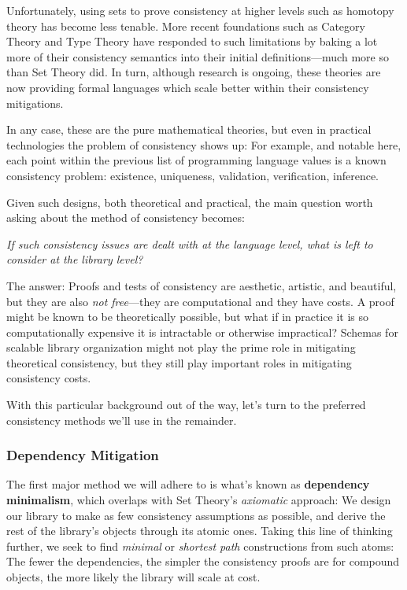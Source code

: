 \documentclass[twoside]{article}
\newcommand{\strong}[1]{{\bfseries #1}}
\begin{document}
Unfortunately, using sets to prove consistency at higher levels such as homotopy theory has become less tenable. More recent
foundations such as Category Theory and Type Theory have responded to such limitations by baking a lot more of their consistency
semantics into their initial definitions---much more so than Set Theory did. In turn, although research is ongoing, these theories
are now providing formal languages which scale better within their consistency mitigations.

In any case, these are the pure mathematical theories, but even in practical technologies the problem of consistency shows
up: For example, and notable here, each point within the previous list of programming language values is a known consistency
problem: existence, uniqueness, validation, verification, inference.

Given such designs, both theoretical and practical, the main question worth asking about the method of consistency becomes:

\begin{center}
\emph{If such consistency issues are dealt with at the language level, what is left to consider at the library level?}
\end{center}

The answer: Proofs and tests of consistency are aesthetic, artistic, and beautiful, but they are also \emph{not free}---they
are computational and they have costs. A proof might be known to be theoretically possible, but what if in practice it is so
computationally expensive it is intractable or otherwise impractical? Schemas for scalable library organization might not play
the prime role in mitigating theoretical consistency, but they still play important roles in mitigating consistency costs.

With this particular background out of the way, let's turn to the preferred consistency methods we'll use in the remainder.

\subsubsection*{Dependency Mitigation}

The first major method we will adhere to is what's known as \strong{dependency minimalism}, which overlaps with Set Theory's
\emph{axiomatic} approach: We design our library to make as few consistency assumptions as possible, and derive the rest of
the library's objects through its atomic ones. Taking this line of thinking further, we seek to find \emph{minimal} or
\emph{shortest path} constructions from such atoms: The fewer the dependencies, the simpler the consistency proofs are
for compound objects, the more likely the library will scale at cost.
\end{document}
